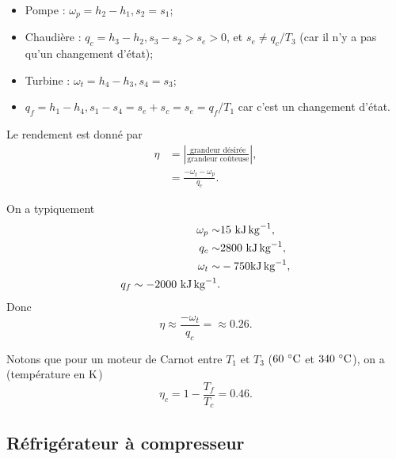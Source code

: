         \begin{itemize}
            \item Pompe : $\omega_p=h_2-h_1, s_2=s_1$;
            \item Chaudière : $q_c=h_3-h_2, s_3-s_2>s_e>0$, et $s_e\neq q_c/T_3$ (car il n'y a pas qu'un changement d'état);
            \item Turbine : $\omega_t=h_4-h_3,s_4=s_3$;
            \item $q_f=h_1-h_4,s_1-s_4=s_e+s_c=s_e=q_f/T_1$ car c'est un changement d'état.
        \end{itemize}

        Le rendement est donné par 
        \begin{align*}
            \eta
            &=
            \left\lvert\frac{\text{grandeur désirée}}{\text{grandeur coûteuse}}\right\rvert,\\
            &=\frac{-\omega_t-\omega_p}{q_c}.
        \end{align*}

        On a typiquement
        \begin{equation*}
            \begin{aligned}
                \omega_p\sim&15~\si[]{\kilo\joule\per\kilogram},\\
                q_c\sim&2800~\si[]{\kilo\joule\per\kilogram},\\
                \omega_t\sim&-750\si[]{\kilo\joule\per\kilogram},\\
                q_f\sim-2000~\si[]{\kilo\joule\per\kilogram}.
            \end{aligned}
        \end{equation*}
        Donc 
        \begin{equation*}
            \boxed{
                \eta\approx\frac{-\omega_t}{q_c}=\approx 0.26.
            }
        \end{equation*}

        Notons que pour un moteur de Carnot entre $T_1$ et $T_3$ ($60~\si[]{\celsius}$ et $340~\si[]{\celsius}$), on a (température en $\si[]{\kelvin}$)
        \begin{equation*}
            \eta_c=1-\frac{T_f}{T_c}=0.46.
        \end{equation*}

    \subsection{Réfrigérateur à compresseur}
        
